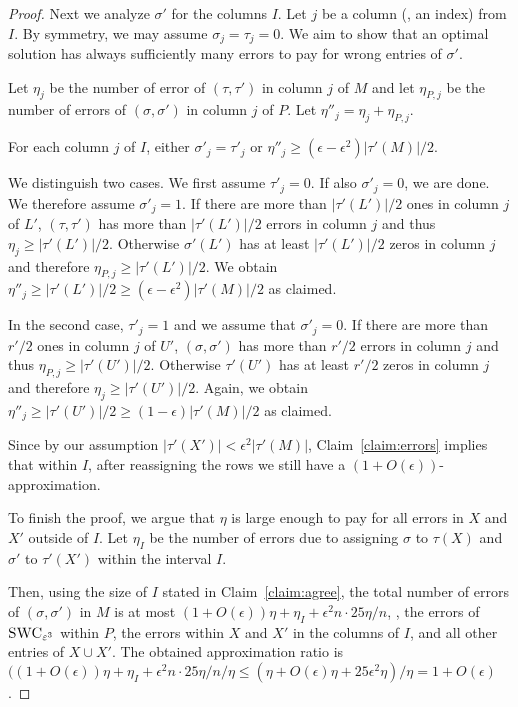 \begin{proof}
    Next we analyze $\sigma'$ for the columns $I$.
    Let $j$ be a column (\ie, an index) from $I$.
    By symmetry, we may assume $\sigma_j = \tau_j = 0$. 
    We aim to show that an optimal solution has always sufficiently many errors to pay for wrong entries of $\sigma'$.

    Let $\eta_j$ be the number of error of $(\tau,\tau')$ in column $j$ of $M$ and
    let $\eta_{P,j}$ be the number of errors of $(\sigma,\sigma')$ in column $j$ of $P$.
    Let $\eta''_j = \eta_j + \eta_{P,j}$.
    \begin{claim}\label{claim:errors}
        For each column $j$ of $I$, either $\sigma'_j = \tau'_j$ or $\eta''_j \ge (\epsilon-\epsilon^2)|\tau'(M)|/2$.
    \end{claim}
    \begin{subproof}
        We distinguish two cases.
        We first assume $\tau'_j = 0$.
        If also $\sigma'_j = 0$, we are done. 
        We therefore assume $\sigma'_j = 1$.
        If there are more than $|\tau'(L')|/2$ ones in column $j$ of $L'$, $(\tau,\tau')$ has more than $|\tau'(L')|/2$ errors in column $j$ and thus 
        $\eta_j \ge |\tau'(L')|/2$.
        Otherwise $\sigma'(L')$ has at least $|\tau'(L')|/2$ zeros in column $j$ and therefore $\eta_{P,j} \ge |\tau'(L')|/2$.
        We obtain $\eta''_j \ge |\tau'(L')|/2 \ge (\epsilon-\epsilon^2) |\tau'(M)|/2$ as claimed.

        In the second case, $\tau'_j = 1$ and we assume that $\sigma'_j = 0$.
        If there are more than $r'/2$ ones in column $j$ of $U'$, $(\sigma,\sigma')$ has more than $r'/2$ errors in column $j$ and thus $\eta_{P,j} \ge |\tau'(U')|/2$.
        Otherwise $\tau'(U')$ has at least $r'/2$ zeros in column $j$ and therefore $\eta_j \ge |\tau'(U')|/2$.
        Again, we obtain $\eta''_j \ge |\tau'(U')|/2 \ge (1-\epsilon) |\tau'(M)|/2$ as claimed.
    \end{subproof}

    Since by our assumption $|\tau'(X')| < \epsilon^2 |\tau'(M)|$,
    Claim~\ref{claim:errors} implies that within $I$, after reassigning the rows we still have a $(1+ O(\epsilon))$-approximation.

    To finish the proof, we argue that $\eta$ is large enough to pay for all errors in $X$ and $X'$ outside of $I$.
    Let $\eta_I$ be the number of errors due to assigning $\sigma$ to $\tau(X)$ and $\sigma'$ to $\tau'(X')$ within the interval $I$.

    Then, using the size of $I$ stated in Claim~\ref{claim:agree}, the total number of errors of $(\sigma,\sigma')$ in $M$ is at most
    $(1+O(\epsilon)) \eta + \eta_I + \epsilon^2 n \cdot 25\eta/n$, \ie, the errors of $\textsc{SWC}_{\epsilon^3}$ within $P$, the errors within $X$ and $X'$ in the columns of $I$, and all other entries of $X \cup X'$.
    The obtained approximation ratio is
    $((1+O(\epsilon)) \eta + \eta_I + \epsilon^2 n \cdot 25\eta/n/\eta 
        \le (\eta + O(\epsilon) \eta + 25 \epsilon^2 \eta)/\eta
        = 1 +  O(\epsilon)$.


\end{proof}
